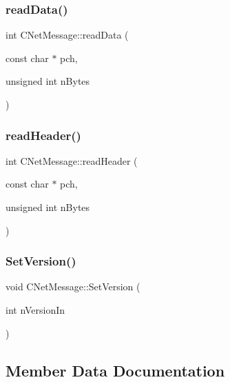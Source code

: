 \subsubsection{\texorpdfstring{read\+Data()}{readData()}}
{\footnotesize\ttfamily int C\+Net\+Message\+::read\+Data (\begin{DoxyParamCaption}\item[{const char $\ast$}]{pch,  }\item[{unsigned int}]{n\+Bytes }\end{DoxyParamCaption})}

\mbox{\label{class_c_net_message_a3e58f5f29b23d1377f8fd15fc75c78ac}} 
\subsubsection{\texorpdfstring{read\+Header()}{readHeader()}}
{\footnotesize\ttfamily int C\+Net\+Message\+::read\+Header (\begin{DoxyParamCaption}\item[{const char $\ast$}]{pch,  }\item[{unsigned int}]{n\+Bytes }\end{DoxyParamCaption})}

\mbox{\label{class_c_net_message_a63b9f2351d5e92126cacacd51d9e16b6}} 
\subsubsection{\texorpdfstring{Set\+Version()}{SetVersion()}}
{\footnotesize\ttfamily void C\+Net\+Message\+::\+Set\+Version (\begin{DoxyParamCaption}\item[{int}]{n\+Version\+In }\end{DoxyParamCaption})\hspace{0.3cm}{\ttfamily [inline]}}



\subsection{Member Data Documentation}
\mbox{\label{class_c_net_message_ae7215dca62862a3688f7eeb94646c377}} 
